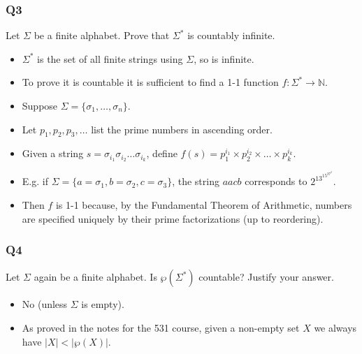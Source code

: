 \documentclass[handout]{beamer}
\newcommand{\bN}{\mathbb{N}}
\begin{document}
\begin{frame}
\frametitle{Q3}
Let $\Sigma$ be a finite alphabet. Prove that $\Sigma^*$ is countably infinite. 
\vspace{0.5cm}
\begin{itemize}
\item $\Sigma^*$ is the set of all finite strings using $\Sigma$, so is infinite. 
\vspace{0.2cm}
\item To prove it is countable it is sufficient to find a 1-1 function $f:\Sigma^*\to \bN$. 
\vspace{0.2cm}
\item Suppose $\Sigma = \{\sigma_1,\ldots,\sigma_n\}$. 
\vspace{0.2cm}
\item Let $p_1,p_2,p_3,\ldots$ list the prime numbers in ascending order. 
\vspace{0.2cm}
\item Given a string $s = \sigma_{i_1}\sigma_{i_2}\ldots\sigma_{i_k}$, define $f(s) = p_1^{i_1}\times p_2^{i_2}\times \ldots \times p_k^{i_k}$. 
\vspace{0.2cm}
\item E.g. if $\Sigma = \{ a = \sigma_1, b = \sigma_2, c=\sigma_3\}$, the string $aacb$ corresponds to $2^13^15^37^2$.  
\vspace{0.2cm}
\item Then $f$ is 1-1 because, by the Fundamental Theorem of Arithmetic, numbers are specified uniquely by their prime factorizations (up to reordering).
\end{itemize}
\end{frame}

\begin{frame}
\frametitle{Q4}
Let $\Sigma$ again be a finite alphabet. Is $\wp(\Sigma^*)$ countable? Justify your answer.
\vspace{0.7cm}
\begin{itemize}
\item No (unless $\Sigma$ is empty).
\vspace{0.3cm}
\item As proved in the notes for the 531 course, given a non-empty set $X$ we always have $|X|<|\wp(X)|$. 
\end{itemize}
\end{frame}
\end{document}
